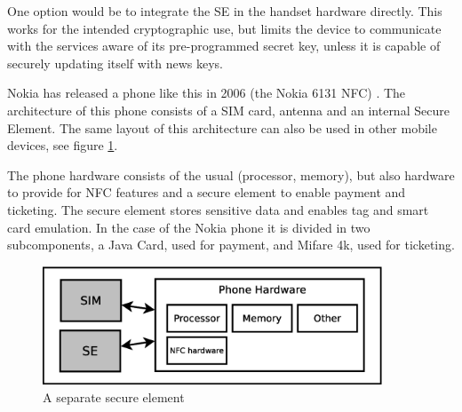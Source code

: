 





One option would be to integrate the SE in the handset hardware directly.
This works for the intended cryptographic use, but limits the device to communicate with the services aware of its pre-programmed secret key, unless it is capable of securely updating itself with news keys.

Nokia has released a phone like this in 2006 (the Nokia 6131 NFC) . %
The architecture of this phone consists of a SIM card, antenna and an internal Secure Element.
The same layout of this architecture can also be used in other mobile devices, see figure \ref{fig:integrated_se}.

The phone hardware consists of the usual (processor, memory), but also hardware to provide for NFC features and a secure element to enable payment and ticketing.
The secure element stores sensitive data and enables tag and smart card emulation.
In the case of the Nokia phone it is divided in two subcomponents, a Java Card, used for payment, and Mifare 4k, used for ticketing.

\begin{figure}
\includegraphics[width=0.9\textwidth]{images/phone_with_SE_nokia}
\caption[Nokia phone with SE]
{
A separate secure element
}
\label{fig:integrated_se}
\end{figure}


